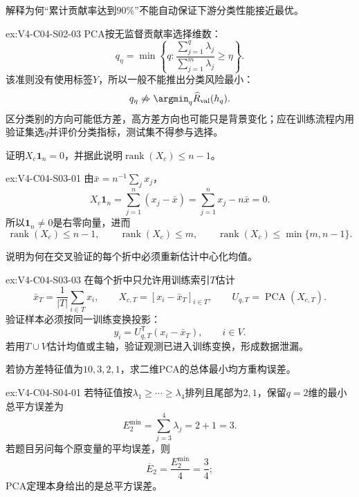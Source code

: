 \begin{SLChapterExercisePairSection}
\begin{exercise}\label{ex:V4-C04-S02-03}
解释为何“累计贡献率达到$90\%$”不能自动保证下游分类性能接近最优。
\end{exercise}
\ifSLFullEdition
{}\label{sol:V4-C04-S02-03}
\begin{chapterexercisesolution}{ex:V4-C04-S02-03}
PCA按无监督贡献率选择维数：
\[
q_{\eta}=\min\left\{q:
\frac{\sum_{j=1}^{q}\lambda_j}{\sum_{j=1}^{m}\lambda_j}
\ge\eta\right\}.
\]
该准则没有使用标签$Y$，所以一般不能推出分类风险最小：
\[
q_{\eta}\not\Rightarrow
\argmin_q\widehat R_{\mathrm{val}}(h_q).
\]
区分类别的方向可能低方差，高方差方向也可能只是背景变化；应在训练流程内用验证集选$q$并评价分类指标，测试集不得参与选择。
\end{chapterexercisesolution}
\fi

\begin{exercise}\label{ex:V4-C04-S03-01}
证明$X_c\mathbf 1_n=0$，并据此说明$\operatorname{rank}(X_c)\le n-1$。
\end{exercise}
\ifSLFullEdition
{}\label{sol:V4-C04-S03-01}
\begin{chapterexercisesolution}{ex:V4-C04-S03-01}
由$\bar x=n^{-1}\sum_jx_j$，
\[
X_c\mathbf1_n
=\sum_{j=1}^{n}(x_j-\bar x)
=\sum_{j=1}^{n}x_j-n\bar x=0.
\]
所以$\mathbf1_n\ne0$是右零向量，进而
\[
\operatorname{rank}(X_c)\le n-1,
\qquad
\operatorname{rank}(X_c)\le m,
\qquad
\operatorname{rank}(X_c)\le\min\{m,n-1\}.
\]
\end{chapterexercisesolution}
\fi

\begin{exercise}\label{ex:V4-C04-S03-03}
说明为何在交叉验证的每个折中必须重新估计中心化均值。
\end{exercise}
\ifSLFullEdition
{}\label{sol:V4-C04-S03-03}
\begin{chapterexercisesolution}{ex:V4-C04-S03-03}
在每个折中只允许用训练索引$T$估计
\[
\bar x_T=\frac1{|T|}\sum_{i\in T}x_i,
\qquad
X_{c,T}=[x_i-\bar x_T]_{i\in T},
\qquad
U_{q,T}=\operatorname{PCA}(X_{c,T}).
\]
验证样本必须按同一训练变换投影：
\[
y_i=U_{q,T}^{\mathsf T}(x_i-\bar x_T),
\qquad i\in V.
\]
若用$T\cup V$估计均值或主轴，验证观测已进入训练变换，形成数据泄漏。
\end{chapterexercisesolution}
\fi

\begin{exercise}\label{ex:V4-C04-S04-01}
若协方差特征值为$10,3,2,1$，求二维PCA的总体最小均方重构误差。
\end{exercise}
\ifSLFullEdition
{}\label{sol:V4-C04-S04-01}
\begin{chapterexercisesolution}{ex:V4-C04-S04-01}
若特征值按$\lambda_1\ge\cdots\ge\lambda_4$排列且尾部为$2,1$，保留$q=2$维的最小总平方误差为
\[
E_2^{\min}=\sum_{j=3}^{4}\lambda_j=2+1=3.
\]
若题目另问每个原变量的平均误差，则
\[
\overline E_2=\frac{E_2^{\min}}{4}=\frac34;
\]
PCA定理本身给出的是总平方误差。
\end{chapterexercisesolution}
\fi


\end{SLChapterExercisePairSection}
